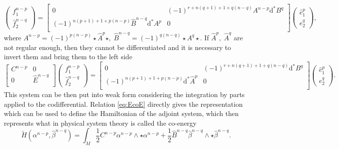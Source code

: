 \documentclass{elsarticle}
\renewcommand\d{\ensuremath{\mathrm{d}}}
\newcommand*{\dual}[1]{\ensuremath{\widehat{#1}}}
\begin{document}
\begin{equation}\label{eq:AdjStokesDirac2}
    \begin{pmatrix}
    {f}^{n-p}_1 \\
    \dual{f}^{n-q}_2
    \end{pmatrix} = 
    \begin{bmatrix}
        0 &  (-1)^{r + n(q+1)+1 +q(n-q)}
        {A}^{n-p} \d^* B^q \\
        (-1)^{n(p+1)+1+p(n-p)} \dual{B}^{n-q} \d^* A^p & 0 \\
    \end{bmatrix}
    \begin{pmatrix}
        \dual{e}^{p}_1\\
        {e}^{q}_2
    \end{pmatrix},
\end{equation}
where ${A}^{n-p} = (-1)^{p(n-p)} \star \dual{A}^p \star, \; \dual{B}^{n-q} = (-1)^{q(n-q)} \star A^q \star$. 
If $\dual{A}^p, \; \dual{A}^q$ are not regular enough, then they cannot be differentiated and it is necessary to invert them and bring them to the left side
\begin{equation}
\begin{bmatrix}
    {C}^{n-p} & 0 \\
    0 & \dual{E}^{n-q} \\
\end{bmatrix}
     \begin{pmatrix}
    {f}^{n-p}_1 \\
    \dual{f}^{n-q}_2
    \end{pmatrix} = 
    \begin{bmatrix}
        0 &  (-1)^{r + n(q+1)+1 +q(n-q)}\d^* B^q \\
        (-1)^{n(p+1)+1+p(n-p)} \d^* \dual{A}^p & 0 \\
    \end{bmatrix}
    \begin{pmatrix}
        \dual{e}^{p}_1\\
        {e}^{q}_2
    \end{pmatrix}.
\end{equation}
This system can be then put into weak form considering the integration by parts applied to the codifferential. Relation \eqref{eq:EcoE}  directly gives the representation which  can be used to define the Hamiltonian of the adjoint system, which then represents what in physical system theory is called the co-energy
\begin{equation}
\widetilde{H}({\alpha}^{n-p}, \dual{\beta}^{n-q})  = \int_M \frac{1}{2} {C}^{n-p} {\alpha}^{n-p} \wedge \star {\alpha}^{n-p} + \frac{1}{2}  \dual{B}^{n-q} \dual{\beta}^{n-q}\wedge \star \dual{\beta}^{n-q}.
\end{equation}
\end{document}

